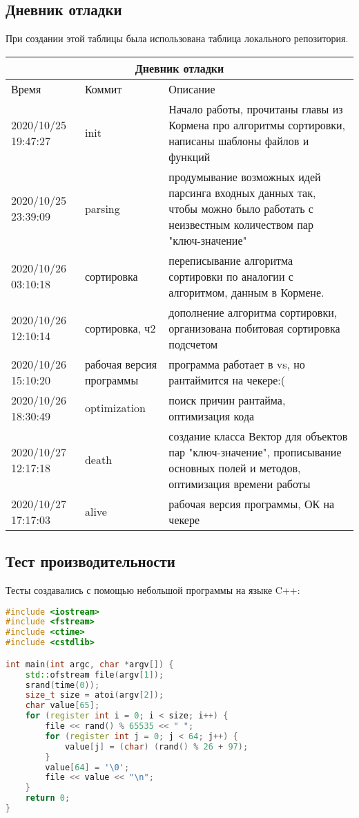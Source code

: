 \documentclass[12pt]{article}
\begin{document}
\newpage
\clearpage

\subsection*{Дневник отладки}

При создании этой таблицы была использована таблица локального репозитория.
\begin{table}[!htb]
\begin{tabular}{|m{2cm}|m{3cm}|m{11cm}|}
\hline
\multicolumn{3}{|c|}{Дневник отладки} \\ 
\hline
Время & Коммит & Описание \\
\hline
2020/10/25  19:47:27 & init & Начало работы, прочитаны главы из Кормена про алгоритмы сортировки, написаны шаблоны файлов и функций \\
\hline
2020/10/25 23:39:09 & parsing & продумывание возможных идей парсинга входных данных так, чтобы можно было работать с неизвестным количеством пар "ключ-значение" \\
\hline
2020/10/26 03:10:18 & сортировка & переписывание алгоритма сортировки по аналогии с алгоритмом, данным в Кормене. \\
\hline
2020/10/26 12:10:14 & сортировка, ч2 & дополнение алгоритма сортировки, организована побитовая сортировка подсчетом \\
\hline
2020/10/26 15:10:20 & рабочая версия программы & программа работает в vs, но рантаймится на чекере:( \\
\hline
2020/10/26 18:30:49 & optimization & поиск причин рантайма, оптимизация кода \\
\hline
2020/10/27 12:17:18 & death & создание класса Вектор для объектов пар "ключ-значение", прописывание основных полей и методов, оптимизация времени работы\\
\hline
2020/10/27 17:17:03 & alive & рабочая версия программы, ОК на чекере\\
\hline
\end{tabular}
\end{table}

\subsection*{Тест производительности}

Тесты создавались с помощью небольшой программы на языке C++:


\begin{lstlisting}[language=C++]
#include <iostream>
#include <fstream>
#include <ctime>
#include <cstdlib>

int main(int argc, char *argv[]) {
	std::ofstream file(argv[1]);
	srand(time(0));
	size_t size = atoi(argv[2]);
	char value[65];
	for (register int i = 0; i < size; i++) {
		file << rand() % 65535 << " ";
		for (register int j = 0; j < 64; j++) {
			value[j] = (char) (rand() % 26 + 97);
		}
		value[64] = '\0';
		file << value << "\n";
	}
	return 0;
}
\end{lstlisting}
\end{document}
